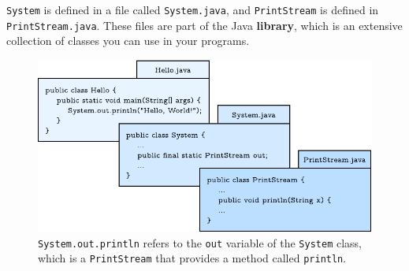\documentclass[12pt]{book}
\theoremstyle{exercise}
\newcommand{\java}[1]{\verb"#1"}
\newcommand{\java}[1]{\lstinline{#1}} %
\begin{document}

\java{System} is defined in a file called {\tt System.java}, and {\tt PrintStream} is defined in {\tt PrintStream.java}.
These files are part of the Java {\bf library}, which is an extensive collection of classes you can use in your programs.

\begin{figure}[!h]
\begin{center}
\includegraphics{figs/system.pdf}
\caption{\java{System.out.println} refers to the \java{out} variable of the \java{System} class, which is a \java{PrintStream} that provides a method called \java{println}.}
\end{center}
\end{figure}







\end{document}
